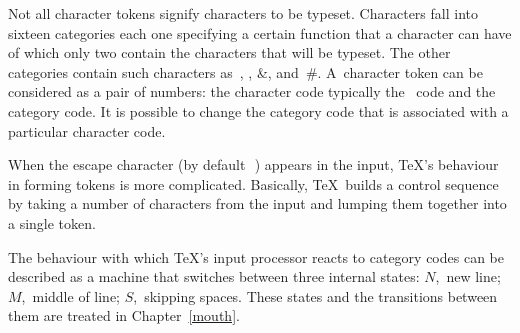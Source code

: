 \documentclass[letterpaper]{book}
\begin{document}
Not all character tokens signify characters to be typeset.
\altt
Characters fall into sixteen categories \ldash each one
specifying a certain function that a character can have \rdash 
of which only two contain the characters that will be
typeset. The other categories contain such characters 
as~, , 
\n\&, and~\n\#. A~character token can be considered
as a pair of numbers: the character code \ldash typically the \ascii\
code \rdash  and the category code.
It is possible to change
the category code that is associated with a particular
character code.

When the escape character (by default~\cs{}$\,$) appears in the input,
\TeX's behaviour in forming tokens is more complicated. 
Basically,
\TeX\ builds a control sequence by taking a number of characters
from the input and lumping them together into a single token.

The behaviour with which \TeX's input processor 
reacts to category codes can be described
as a machine that switches between three internal states:
$N$,~new line; $M$,~middle of line; $S$,~skipping spaces.
These states and the transitions between them are treated
in Chapter~\ref{mouth}.

\end{document}
